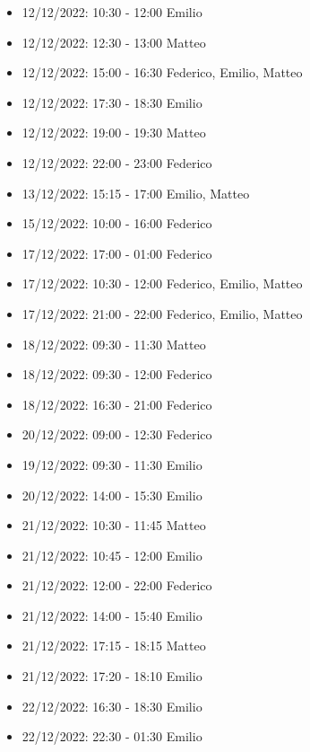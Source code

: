 \begin{itemize}
    \item 12/12/2022: 10:30 - 12:00 Emilio
    \item 12/12/2022: 12:30 - 13:00 Matteo
    \item 12/12/2022: 15:00 - 16:30 Federico, Emilio, Matteo
    \item 12/12/2022: 17:30 - 18:30 Emilio
    \item 12/12/2022: 19:00 - 19:30 Matteo
    \item 12/12/2022: 22:00 - 23:00 Federico
    \item 13/12/2022: 15:15 - 17:00 Emilio, Matteo
    \item 15/12/2022: 10:00 - 16:00 Federico
    \item 17/12/2022: 17:00 - 01:00 Federico
    \item 17/12/2022: 10:30 - 12:00 Federico, Emilio, Matteo
    \item 17/12/2022: 21:00 - 22:00 Federico, Emilio, Matteo
    \item 18/12/2022: 09:30 - 11:30 Matteo
    \item 18/12/2022: 09:30 - 12:00 Federico
    \item 18/12/2022: 16:30 - 21:00 Federico
    \item 20/12/2022: 09:00 - 12:30 Federico
    \item 19/12/2022: 09:30 - 11:30 Emilio
    \item 20/12/2022: 14:00 - 15:30 Emilio
    \item 21/12/2022: 10:30 - 11:45 Matteo
    \item 21/12/2022: 10:45 - 12:00 Emilio
    \item 21/12/2022: 12:00 - 22:00 Federico
    \item 21/12/2022: 14:00 - 15:40 Emilio
    \item 21/12/2022: 17:15 - 18:15 Matteo
    \item 21/12/2022: 17:20 - 18:10 Emilio
    \item 22/12/2022: 16:30 - 18:30 Emilio
    \item 22/12/2022: 22:30 - 01:30 Emilio
\end{itemize}